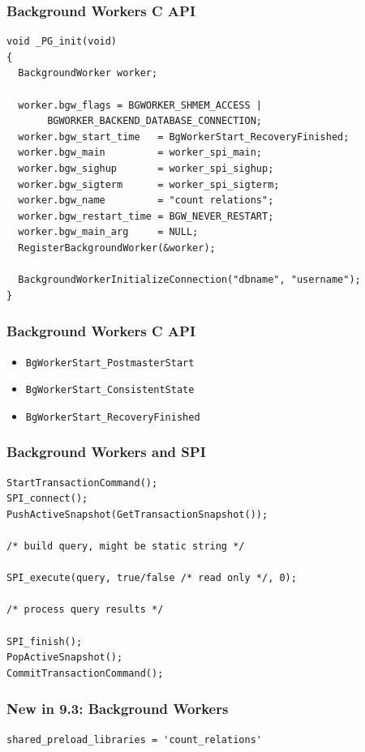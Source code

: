 \documentclass{beamer}
\begin{document}
\begin{frame}[fragile]
  \frametitle{Background Workers C API}

\begin{verbatim}
void _PG_init(void)
{
  BackgroundWorker worker;

  worker.bgw_flags = BGWORKER_SHMEM_ACCESS |
       BGWORKER_BACKEND_DATABASE_CONNECTION;
  worker.bgw_start_time   = BgWorkerStart_RecoveryFinished;
  worker.bgw_main         = worker_spi_main;
  worker.bgw_sighup       = worker_spi_sighup;
  worker.bgw_sigterm      = worker_spi_sigterm;
  worker.bgw_name         = "count relations";
  worker.bgw_restart_time = BGW_NEVER_RESTART;
  worker.bgw_main_arg     = NULL;
  RegisterBackgroundWorker(&worker);

  BackgroundWorkerInitializeConnection("dbname", "username");
}
\end{verbatim}
\end{frame}

\begin{frame}[fragile]
  \frametitle{Background Workers C API}

  \vfill

  \begin{itemize}
  \item \texttt{BgWorkerStart\_PostmasterStart}
  \item \texttt{BgWorkerStart\_ConsistentState}
  \item \texttt{BgWorkerStart\_RecoveryFinished}
  \end{itemize}
\end{frame}

\begin{frame}[fragile]
  \frametitle{Background Workers and SPI}

\begin{verbatim}
StartTransactionCommand();
SPI_connect();
PushActiveSnapshot(GetTransactionSnapshot());

/* build query, might be static string */

SPI_execute(query, true/false /* read only */, 0);

/* process query results */

SPI_finish();
PopActiveSnapshot();
CommitTransactionCommand();
\end{verbatim}
\end{frame}

\begin{frame}[fragile]
  \frametitle{New in 9.3: Background Workers}

  \vfill

\begin{verbatim}
shared_preload_libraries = 'count_relations'
\end{verbatim}
\end{frame}
\end{document}
